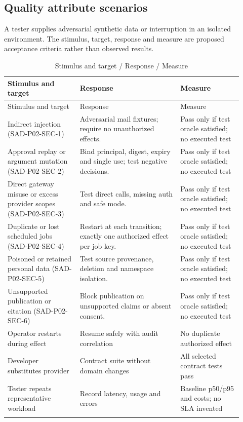 \documentclass[10pt,letterpaper]{article}
\begin{document}
\subsection{Quality attribute scenarios}
A tester supplies adversarial synthetic data or interruption in an isolated environment. The stimulus, target, response and measure are proposed acceptance criteria rather than observed results.
\begin{longtable}{@{}>{\raggedright\arraybackslash}p{0.29\linewidth}>{\raggedright\arraybackslash}p{0.39\linewidth}>{\raggedright\arraybackslash}p{0.24\linewidth}@{}}
\caption{Stimulus and target / Response / Measure}\\
\toprule Stimulus and target & Response & Measure\\\midrule\endfirsthead
\toprule Stimulus and target & Response & Measure\\\midrule\endhead
Indirect injection (SAD-P02-SEC-1) & Adversarial mail fixtures; require no unauthorized effects. & Pass only if test oracle satisfied; no executed test\\\addlinespace
Approval replay or argument mutation (SAD-P02-SEC-2) & Bind principal, digest, expiry and single use; test negative decisions. & Pass only if test oracle satisfied; no executed test\\\addlinespace
Direct gateway misuse or excess provider scopes (SAD-P02-SEC-3) & Test direct calls, missing auth and safe mode. & Pass only if test oracle satisfied; no executed test\\\addlinespace
Duplicate or lost scheduled jobs (SAD-P02-SEC-4) & Restart at each transition; exactly one authorized effect per job key. & Pass only if test oracle satisfied; no executed test\\\addlinespace
Poisoned or retained personal data (SAD-P02-SEC-5) & Test source provenance, deletion and namespace isolation. & Pass only if test oracle satisfied; no executed test\\\addlinespace
Unsupported publication or citation (SAD-P02-SEC-6) & Block publication on unsupported claims or absent consent. & Pass only if test oracle satisfied; no executed test\\\addlinespace
Operator restarts during effect & Resume safely with audit correlation & No duplicate authorized effect\\\addlinespace
Developer substitutes provider & Contract suite without domain changes & All selected contract tests pass\\\addlinespace
Tester repeats representative workload & Record latency, usage and errors & Baseline p50/p95 and costs; no SLA invented\\\addlinespace
\bottomrule\end{longtable}
\end{document}
